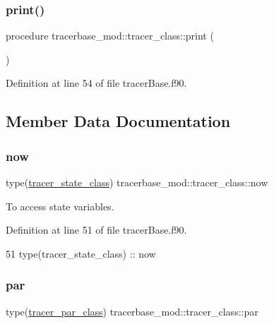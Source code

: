 \subsubsection{\texorpdfstring{print()}{print()}}
{\footnotesize\ttfamily procedure tracerbase\+\_\+mod\+::tracer\+\_\+class\+::print (\begin{DoxyParamCaption}{ }\end{DoxyParamCaption})\hspace{0.3cm}{\ttfamily [private]}}



Definition at line 54 of file tracer\+Base.\+f90.



\subsection{Member Data Documentation}
\mbox{\label{structtracerbase__mod_1_1tracer__class_ad1a1e2f727ad281e2562952d6ba94526}} 
\subsubsection{\texorpdfstring{now}{now}}
{\footnotesize\ttfamily type(\mbox{\hyperlink{structtracerbase__mod_1_1tracer__state__class}{tracer\+\_\+state\+\_\+class}}) tracerbase\+\_\+mod\+::tracer\+\_\+class\+::now\hspace{0.3cm}{\ttfamily [private]}}



To access state variables. 



Definition at line 51 of file tracer\+Base.\+f90.


\begin{DoxyCode}
51         \textcolor{keywordtype}{type}(tracer\_state\_class) :: now
\end{DoxyCode}
\mbox{\label{structtracerbase__mod_1_1tracer__class_aca04297200aad39fd04e31b630d9ca50}} 
\subsubsection{\texorpdfstring{par}{par}}
{\footnotesize\ttfamily type(\mbox{\hyperlink{structtracerbase__mod_1_1tracer__par__class}{tracer\+\_\+par\+\_\+class}}) tracerbase\+\_\+mod\+::tracer\+\_\+class\+::par\hspace{0.3cm}{\ttfamily [private]}}




